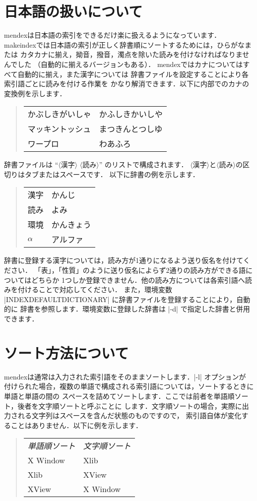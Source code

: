 \documentclass[a4paper,dvipdfmx]{jsarticle}
\newcommand{\SoftName}[1]{\textsf{#1}}
\newcommand{\jMeta}[1]{$\langle$\mbox{}\textsf{#1}\mbox{}$\rangle$}
\begin{document}
\section{日本語の扱いについて}

\SoftName{mendex}は日本語の索引をできるだけ楽に扱えるようになっています．
\SoftName{makeindex}では日本語の索引が正しく辞書順にソートするためには，ひらがなまたは
カタカナに揃え，拗音，撥音，濁点を除いた読みを付けなければなりませんでした
（自動的に揃えるバージョンもある）．
\SoftName{mendex}ではカナについてはすべて自動的に揃え，また漢字については
辞書ファイルを設定することにより各索引語ごとに読みを付ける作業を
かなり解消できます．以下に内部でのカナの変換例を示します．
%
\begin{quote}
\begin{tabular}{ll}
かぶしきがいしゃ & かふしきかいしや \\
マッキントッシュ & まつきんとつしゆ \\
ワープロ & わあふろ
\end{tabular}
\end{quote}

辞書ファイルは ``\jMeta{漢字} \jMeta{読み}'' のリストで構成されます．
\jMeta{漢字}と\jMeta{読み}の区切りはタブまたはスペースです．
以下に辞書の例を示します．
%
\begin{quote}
\begin{tabular}{ll}
漢字 & かんじ \\
読み & よみ \\
環境 & かんきょう \\
$\alpha$ & アルファ
\end{tabular}
\end{quote}

辞書に登録する漢字については，読み方が1通りになるよう送り仮名を付けてください．
「表」，「性質」のように送り仮名によらず2通りの読み方ができる語についてはどちらか
1つしか登録できません．他の読み方については各索引語へ読みを付けることで対応してください．
また，環境変数 |INDEXDEFAULTDICTIONARY| に辞書ファイルを登録することにより，自動的に
辞書を参照します．環境変数に登録した辞書は |-d| で指定した辞書と併用できます．

\section{ソート方法について}

\SoftName{mendex}は通常は入力された索引語をそのままソートします．|-l| オプションが
付けられた場合，複数の単語で構成される索引語については，ソートするときに単語と単語の間の
スペースを詰めてソートします．ここでは前者を単語順ソート，後者を文字順ソートと呼ぶことに
します．文字順ソートの場合，実際に出力される文字列はスペースを含んだ状態のものですので，
索引語自体が変化することはありません．以下に例を示します．
%
\begin{quote}
\begin{tabular}{ll}
\emph{単語順ソート} & \emph{文字順ソート} \\
X Window & Xlib \\
Xlib & XView \\
XView & X Window
\end{tabular}
\end{quote}
\end{document}
